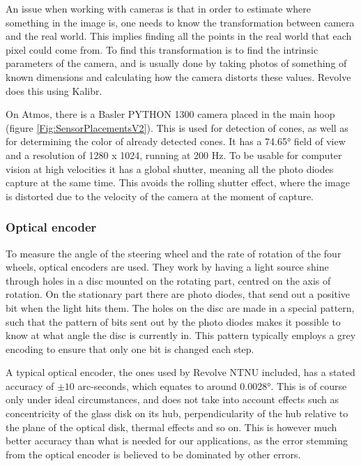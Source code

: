 An issue when working with cameras is that in order to estimate where something in the image is, one needs to know the transformation between camera and the real world. This implies finding all the points in the real world that each pixel could come from. To find this transformation is to find the intrinsic parameters of the camera, and is usually done by taking photos of something of known dimensions and calculating how the camera distorts these values. Revolve does this using Kalibr\cite{Kalibr1}\cite{Kalibr2}\cite{Kalibr3}. 

On Atmos, there is a Basler PYTHON 1300 camera placed in the main hoop (figure \ref{Fig:SensorPlacementsV2}). This is used for detection of cones, as well as for determining the color of already detected cones. It has a 74.65\si{\degree} field of view and a resolution of 1280 x 1024, running at 200 Hz. To be usable for computer vision at high velocities it has a global shutter, meaning all the photo diodes capture at the same time. This avoids the rolling shutter effect, where the image is distorted due to the velocity of the camera at the moment of capture.

\subsubsection{Optical encoder}

To measure the angle of the steering wheel and the rate of rotation of the four wheels, optical encoders are used. They work by having a light source shine through holes in a disc mounted on the rotating part, centred on the axis of rotation. On the stationary part there are photo diodes, that send out a positive bit when the light hits them. The holes on the disc are made in a special pattern, such that the pattern of bits sent out by the photo diodes makes it possible to know at what angle the disc is currently in. This pattern typically employs a grey encoding\cite{GrayCode} to ensure that only one bit is changed each step. 

A typical optical encoder, the ones used by Revolve NTNU included, has a stated accuracy of $\pm 10$ arc-seconds, which equates to around 0.0028\si{\degree}. This is of course only under ideal circumstances, and does not take into account effects such as concentricity of the glass disk on its hub, perpendicularity of the hub relative to the plane of the optical disk, thermal effects and so on. This is however much better accuracy than what is needed for our applications, as the error stemming from the optical encoder is believed to be dominated by other errors.

